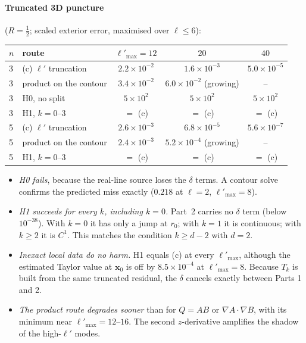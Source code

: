\documentclass[11pt,a4paper]{article}
\newcommand{\x}{\mathbf{x}}
\begin{document}
\paragraph{Truncated 3D puncture} ($R=\tfrac12$; scaled exterior error, maximised over $\ell\le6$):
\begin{center}
\small
\renewcommand{\arraystretch}{1.15}
\begin{tabular}{@{}llccc@{}}
\toprule
$n$ & route & $\ell'_{\max}=12$ & $20$ & $40$\\
\midrule
3 & (c) $\ell'$ truncation & $2.2\times10^{-2}$ & $1.6\times10^{-3}$ & $5.0\times10^{-5}$\\
3 & product on the contour & $3.4\times10^{-2}$ & $6.0\times10^{-2}$ (growing) & --\\
3 & H0, no split & $5\times10^{2}$ & $5\times10^{2}$ & $5\times10^{2}$\\
3 & H1, $k=0$--$3$ & $=$ (c) & $=$ (c) & $=$ (c)\\
5 & (c) $\ell'$ truncation & $2.6\times10^{-3}$ & $6.8\times10^{-5}$ & $5.6\times10^{-7}$\\
5 & product on the contour & $2.4\times10^{-3}$ & $5.2\times10^{-4}$ (growing) & --\\
5 & H1, $k=0$--$3$ & $=$ (c) & $=$ (c) & $=$ (c)\\
\bottomrule
\end{tabular}
\end{center}
\begin{itemize}[nosep]
\item \emph{H0 fails}, because the real-line source loses the $\delta$ terms.
  A contour solve confirms the predicted miss exactly ($0.218$ at $\ell=2$, $\ell'_{\max}=8$).
\item \emph{H1 succeeds for every $k$, including $k=0$.}
  Part~2 carries no $\delta$ term (below $10^{-38}$). With $k=0$ it has only a jump at $r_0$; with $k=1$ it is continuous; with $k\ge2$ it is $C^1$.
  This matches the condition $k\ge d-2$ with $d=2$.
\item \emph{Inexact local data do no harm.}
  H1 equals (c) at every $\ell'_{\max}$, although the estimated Taylor value at $\x_0$ is off by $8.5\times10^{-4}$ at $\ell'_{\max}=8$.
  Because $T_k$ is built from the same truncated residual, the $\delta$ cancels exactly between Parts 1 and 2.
\item \emph{The product route degrades sooner} than for $Q=AB$ or $\nabla A\cdot\nabla B$, with its minimum near $\ell'_{\max}=12$--$16$.
  The second $z$-derivative amplifies the shadow of the high-$\ell'$ modes.
\end{itemize}
\end{document}
